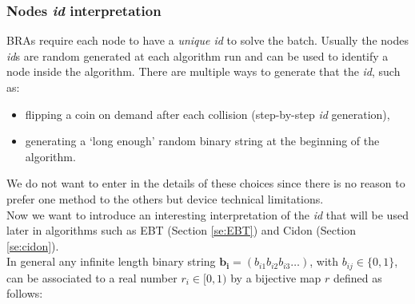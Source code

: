 \documentclass[11pt,a4paper,twoside,openright]{book}
\begin{document}
\subsubsection{Nodes \emph{id} interpretation}
\label{realvalueapproach}
BRAs require each node to have a \emph{unique id} to solve the batch. Usually the nodes \emph{id}s are random generated at each algorithm run and can be used to identify a node inside the algorithm. 
There are multiple ways to generate that the \emph{id}, such as:
\begin{itemize}
\item flipping a coin on demand after each collision (step-by-step \emph{id} generation),
\item generating a `long enough' random binary string  at the beginning of the algorithm.
\end{itemize}
We do not want to enter in the details of these choices since there is no reason to prefer one method to the others but device technical limitations.\\ 
Now we want to introduce an interesting interpretation of the \emph{id} that will be used later in algorithms such as EBT (Section \ref{se:EBT}) and Cidon (Section \ref{se:cidon}).\\

In general any infinite length binary string $\mathbf{b_{i}}=(b_{i1}b_{i2}b_{i3}\ldots)$, with $b_{ij} \in \{0,1\}$, can be associated to a real number $r_{i} \in [0,1)$ by a bijective map $r$ defined as follows:
\end{document}
